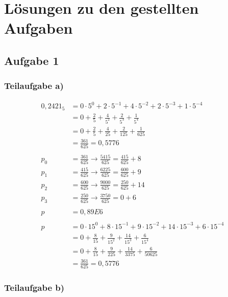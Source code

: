 \documentclass{llncs}
\begin{document}
\chapter*{L\"osungen zu den gestellten Aufgaben}

\section*{Aufgabe 1}

\subsection*{Teilaufgabe a)}

\begin{align*}
0,2421_5 &= 0 \cdot 5^0 + 2 \cdot 5^{-1} + 4 \cdot 5^{-2} + 2 \cdot 5^{-3} + 1 \cdot 5^{-4} \\
         &= 0 + \frac{2}{5} + \frac{4}{5^2} + \frac{2}{5^3} + \frac{1}{5^4} \\
         &= 0 + \frac{2}{5} + \frac{4}{25} + \frac{2}{125} + \frac{1}{625} \\
         &= \frac{361}{625} = 0,5776 \\
\\
p_0 &= \frac{361}{625} \longrightarrow \frac{5415}{625} = \frac{415}{625} + 8\\
p_1 &= \frac{415}{625} \longrightarrow \frac{6225}{625} = \frac{600}{625} + 9\\
p_2 &= \frac{600}{625} \longrightarrow \frac{9000}{625} = \frac{250}{625} + 14\\
p_3 &= \frac{250}{625} \longrightarrow \frac{3750}{625} = 0 + 6\\
\\
   p &= 0,89E6\\
   \\
   p &= 0 \cdot 15^0 + 8 \cdot 15^{-1} + 9 \cdot 15^{-2} + 14 \cdot 15^{-3} + 6 \cdot 15^{-4} \\
     &= 0 + \frac{8}{15} + \frac{9}{15^2} + \frac{14}{15^3} + \frac{6}{15^4} \\
     &= 0 + \frac{8}{15} + \frac{9}{225} + \frac{14}{3375} + \frac{6}{50625} \\
     &= \frac{361}{625} = 0,5776
\end{align*}
\newpage

\subsection*{Teilaufgabe b)}
\end{document}
